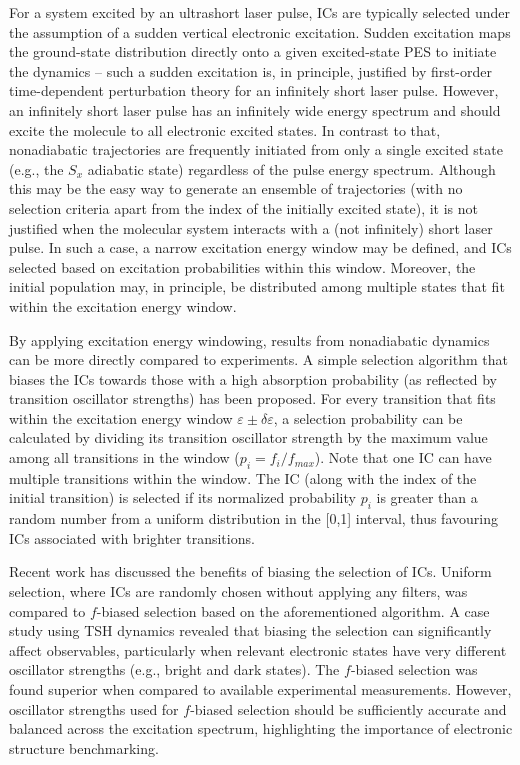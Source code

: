 \documentclass[9pt,bestpractices]{livecoms}
\begin{document}
For a system excited by an ultrashort laser pulse, ICs are typically selected under the assumption of a sudden vertical electronic excitation. Sudden excitation maps the ground-state distribution directly onto a given excited-state PES to initiate the dynamics -- such a sudden excitation is, in principle, justified by first-order time-dependent perturbation theory for an infinitely short laser pulse.\cite{tannor_book} However, an infinitely short laser pulse has an infinitely wide energy spectrum and should excite the molecule to all electronic excited states. In contrast to that, nonadiabatic trajectories are frequently initiated from only a single excited state (e.g., the $S_x$ adiabatic state) regardless of the pulse energy spectrum. Although this may be the easy way to generate an ensemble of trajectories (with no selection criteria apart from the index of the initially excited state), it is not justified when the molecular system interacts with a (not infinitely) short laser pulse. In such a case, a narrow excitation energy window may be defined, and ICs selected based on excitation probabilities within this window. Moreover, the initial population may, in principle, be distributed among multiple states that fit within the excitation energy window.

By applying excitation energy windowing, results from nonadiabatic dynamics can be more directly compared to experiments. A simple selection algorithm that biases the ICs towards those with a high absorption probability (as reflected by transition oscillator strengths) has been proposed.\cite{barbatti2010non, barbatti2022newton} For every transition that fits within the excitation energy window $\varepsilon \pm \delta \varepsilon$, a selection probability can be calculated by dividing its transition oscillator strength by the maximum value among all transitions in the window ($p_i = f_i / f_{max}$). Note that one IC can have multiple transitions within the window. The IC (along with the index of the initial transition) is selected if its normalized probability $p_i$ is greater than a random number from a uniform distribution in the [0,1] interval, thus favouring ICs associated with brighter transitions.

Recent work has discussed the benefits of biasing the selection of ICs.\cite{prlj2023deciphering} Uniform selection, where ICs are randomly chosen without applying any filters, was compared to $f$-biased selection based on the aforementioned algorithm. A case study using TSH dynamics revealed that biasing the selection can significantly affect observables, particularly when relevant electronic states have very different oscillator strengths (e.g., bright and dark states). The $f$-biased selection was found superior when compared to available experimental measurements. However, oscillator strengths used for $f$-biased selection should be sufficiently accurate and balanced across the excitation spectrum, highlighting the importance of electronic structure benchmarking.
\end{document}
